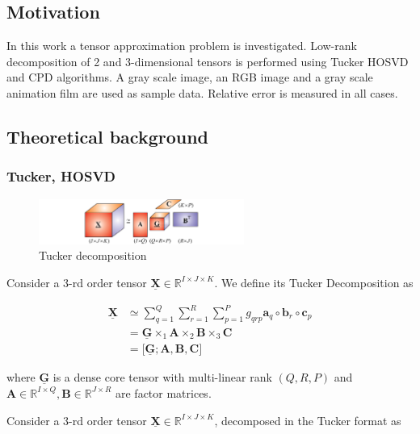 \documentclass[../../main.tex]{subfiles}
\begin{document}
\subsection{Motivation}

In this work a tensor approximation problem is investigated. Low-rank decomposition of 2 and 3-dimensional tensors is performed using Tucker HOSVD and CPD algorithms. A gray scale image, an RGB image and a gray scale animation film are used as sample data. Relative error is measured in all cases. 

\subsection{Theoretical background}

\subsubsection{Tucker, HOSVD}

\begin{figure}[h!]
\centering
\includegraphics[width=0.6\textwidth]{figures/tucker}
\caption{Tucker decomposition}
\label{fig:Lab1:1}
\end{figure}

Consider a 3-rd order tensor $\mathbf{\underline{X}} \in \mathbb{R}^{I \times J \times K}$. We define its Tucker Decomposition as  

\begin{equation}
\begin{aligned}
\mathbf{\underline{X}} & \simeq \sum_{q=1}^{Q} \sum_{r=1}^{R} \sum_{p=1}^{P} g_{qrp} \mathbf{a}_q \circ \mathbf{b}_r \circ \mathbf{c}_p\\
& = \mathbf{\underline{G}} \times_1 \mathbf{A} \times_2 \mathbf{B} \times_3 \mathbf{C}\\
& = \Big[    \mathbf{\underline{G}} ;  \mathbf{A},  \mathbf{B}, \mathbf{C}      \Big]
\end{aligned}
\end{equation}

where $\mathbf{\underline{G}}$ is a dense core tensor with multi-linear rank $(Q,R,P)$ and $\mathbf{A} \in \mathbb{R}^{I \times Q}, \mathbf{B} \in \mathbb{R}^{J \times R}$ are factor matrices.

Consider a 3-rd order tensor $\mathbf{\underline{X}} \in \mathbb{R}^{I \times J \times K}$, decomposed in the Tucker format as 
\end{document}
